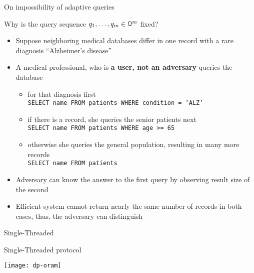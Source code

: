 	\begin{frame}{On impossibility of adaptive queries}

		\begin{block}{Why is the query sequence $\fromNtoM{\query}{1}{m} \in \querySet^m$ fixed?}
			\justify%

			\begin{itemize}
				\item<1-> Suppose neighboring medical databases differ in one record with a rare diagnosis ``Alzheimer's disease''
				\item<2-> A medical professional, who is \textbf{a user, not an adversary} queries the database
					\begin{itemize}
						\item
							for that diagnosis first \\
							\texttt{SELECT name FROM patients WHERE condition = 'ALZ'} %

						\item
							if there is a record, she queries the senior patients next \\
							\texttt{SELECT name FROM patients WHERE age >= 65}

						\item
							otherwise she queries the general population, resulting in many more records \\
							\texttt{SELECT name FROM patients}
					\end{itemize}
				\item<3-> \alert{Adversary can know the answer to the first query by observing result size of the second}
				\item<3-> Efficient system cannot return nearly the same number of records in both cases, thus, the adversary can distinguish
			\end{itemize}

		\end{block}

	\end{frame}

	\begin{frame}{Single-Threaded \epsolute{}}

		\begin{block}{Single-Threaded \epsolute{} protocol}

			\vspace*{2ex}
			\centering
			\texttt{[image: dp-oram]}

		\end{block}

	\end{frame}

